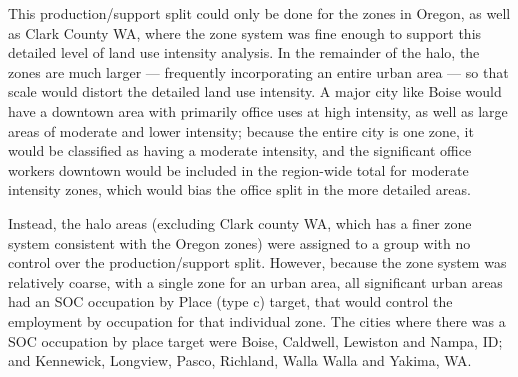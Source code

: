 
This production/support split could only be done for the zones in Oregon, as well as Clark County WA, where the zone system was fine enough to support this detailed level of land use intensity analysis. In the remainder of the halo, the zones are much larger --- frequently incorporating an entire urban area --- so that scale would distort the detailed land use intensity. A major city like Boise would have a downtown area with primarily office uses at high intensity, as well as large areas of moderate and lower intensity; because the entire city is one zone, it would be classified as having a moderate intensity, and the significant office workers downtown would be included in the region-wide total for moderate intensity zones, which would bias the office split in the more detailed areas. 

Instead, the halo areas (excluding Clark county WA, which has a finer zone system consistent with the Oregon zones) were assigned to a group with no control over the production/support split. However, because the zone system was relatively coarse, with a single zone for an urban area, all significant urban areas had an SOC occupation by Place (type c) target, that would control the employment by occupation for that individual zone. The cities where there was a SOC occupation by place target were Boise, Caldwell, Lewiston and Nampa, ID; and Kennewick, Longview, Pasco, Richland, Walla Walla and Yakima, WA.

